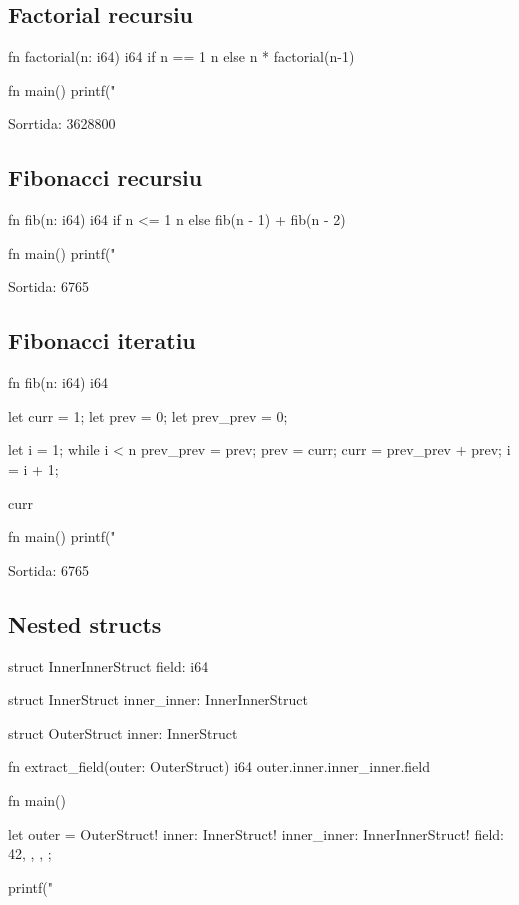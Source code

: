 ﻿\documentclass{article}
\begin{document}
\newpage
\subsection{Factorial recursiu}
\begin{code}
fn factorial(n: i64) i64 {
    if n == 1 {
        n
    } else {
        n * factorial(n-1)
    }
}

fn main() {
    printf("%
}
\end{code}

Sorrtida: 3628800

\subsection{Fibonacci recursiu}
\begin{code}
fn fib(n: i64) i64 {
    if n <= 1 {
        n
    } else {
        fib(n - 1) + fib(n - 2)
    }
}

fn main() {
    printf("%
}
\end{code}

Sortida: 6765

\subsection{Fibonacci iteratiu}

\begin{code}
fn fib(n: i64) i64 {
    let curr = 1;
    let prev = 0;
    let prev_prev = 0;

    let i = 1;
    while i < n {
        prev_prev = prev;
        prev = curr;
        curr = prev_prev + prev;
        i = i + 1;
    }

    curr
}

fn main() {
    printf("%
}
\end{code}

Sortida: 6765

\subsection{Nested structs}

\begin{code}
struct InnerInnerStruct {
    field: i64
}

struct InnerStruct {
    inner_inner: InnerInnerStruct
}

struct OuterStruct {
    inner: InnerStruct
}

fn extract_field(outer: OuterStruct) i64 {
    outer.inner.inner_inner.field
}

fn main() {
    let outer = OuterStruct!{ 
        inner: InnerStruct!{
            inner_inner: InnerInnerStruct!{
                field: 42,
            },
        },
    };

    printf("%
}
\end{code}
\end{document}
